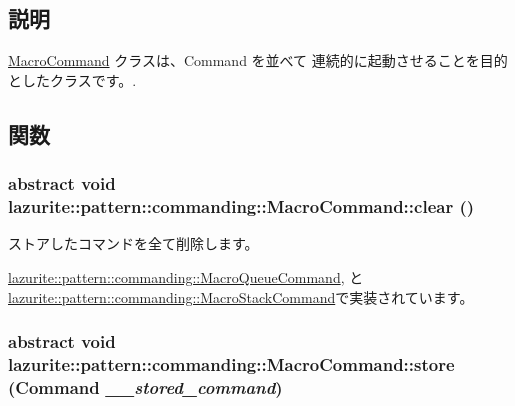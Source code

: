 \subsection{説明}
\hyperlink{classlazurite_1_1pattern_1_1commanding_1_1_macro_command}{MacroCommand} クラスは、Command を並べて 連続的に起動させることを目的としたクラスです。. 

\subsection{関数}
\hypertarget{classlazurite_1_1pattern_1_1commanding_1_1_macro_command_a1ea80d83082f79545609f0c73bda0b7a}{
\subsubsection[{clear}]{\setlength{\rightskip}{0pt plus 5cm}abstract void lazurite::pattern::commanding::MacroCommand::clear ()}}
\label{classlazurite_1_1pattern_1_1commanding_1_1_macro_command_a1ea80d83082f79545609f0c73bda0b7a}


ストアしたコマンドを全て削除します。 

\hyperlink{classlazurite_1_1pattern_1_1commanding_1_1_macro_queue_command_a1f76eeaa709e0610212aa983cd0aaf1d}{lazurite::pattern::commanding::MacroQueueCommand}, と \hyperlink{classlazurite_1_1pattern_1_1commanding_1_1_macro_stack_command_ab0861f5fbede48b5d0a452e5727e737d}{lazurite::pattern::commanding::MacroStackCommand}で実装されています。\hypertarget{classlazurite_1_1pattern_1_1commanding_1_1_macro_command_a3c48d7d5dc8de76e3164794c9ac2f66f}{
\subsubsection[{store}]{\setlength{\rightskip}{0pt plus 5cm}abstract void lazurite::pattern::commanding::MacroCommand::store ({\bf Command} {\em \_\-\_\-stored\_\-command})}}
\label{classlazurite_1_1pattern_1_1commanding_1_1_macro_command_a3c48d7d5dc8de76e3164794c9ac2f66f}


